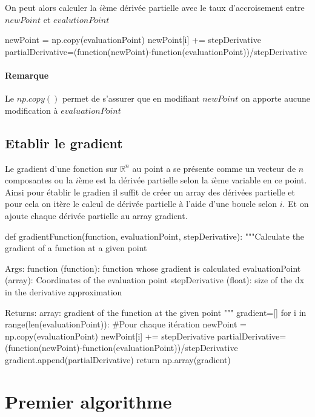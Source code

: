 \documentclass{article}
\begin{document}
On peut alors calculer la $i$ème dérivée partielle avec le taux d'accroisement entre $newPoint$ et $evalutionPoint$

\begin{python}
newPoint = np.copy(evaluationPoint)
newPoint[i] += stepDerivative
partialDerivative=(function(newPoint)-function(evaluationPoint))/stepDerivative
\end{python}
\paragraph{Remarque}
Le $np.copy()$ permet de s'assurer que en modifiant $newPoint$ on apporte aucune modification à $evaluationPoint$

\subsection{Etablir le gradient}
Le gradient d'une fonction sur $\mathbb{R}^n$ au point a se présente comme un vecteur de $n$ composantes ou la $i$ème est la dérivée partielle selon la $i$ème variable en ce point.
\\
Ainsi pour établir le gradien il suffit de créer un array des dérivées partielle et pour cela on itère le calcul de dérivée partielle à l'aide d'une boucle selon $i$. Et on ajoute chaque dérivée partielle au array gradient.

\begin{python}[]
def gradientFunction(function, evaluationPoint, stepDerivative):
    """Calculate the gradient of a function at a given point

    Args:
        function (function): function whose gradient is calculated
        evaluationPoint (array): Coordinates of the evaluation point
        stepDerivative (float): size of the dx in the derivative approximation
    
    Returns:
        array: gradient of the function at the given point
    """
    gradient=[]
    for i in range(len(evaluationPoint)): #Pour chaque itération
        newPoint = np.copy(evaluationPoint)
        newPoint[i] += stepDerivative
        partialDerivative=(function(newPoint)-function(evaluationPoint))/stepDerivative
        gradient.append(partialDerivative)
    return np.array(gradient)
\end{python}

\newpage
\section{Premier algorithme}
\end{document}
